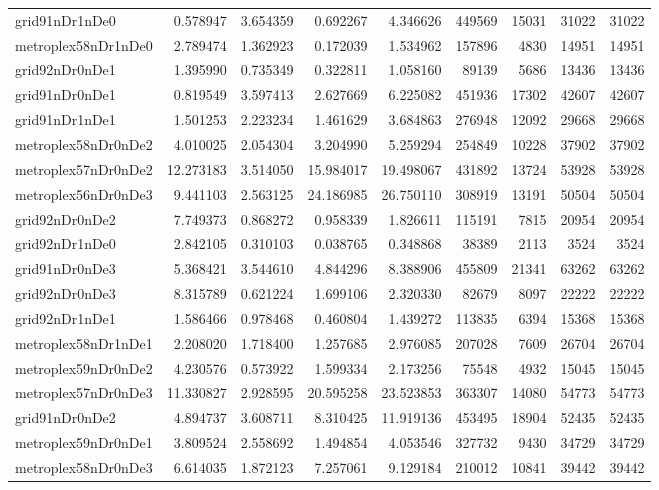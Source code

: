 \documentclass[../../../thesis.tex]{subfiles}
\begin{document}
\begin{longtable}{|l|r|r|r|r|r|r|r|r|}
grid91nDr1nDe0 & 0.578947 & 3.654359 & 0.692267 & 4.346626 & 449569 & 15031 & 31022 & 31022 \\
metroplex58nDr1nDe0 & 2.789474 & 1.362923 & 0.172039 & 1.534962 & 157896 & 4830 & 14951 & 14951 \\
grid92nDr0nDe1 & 1.395990 & 0.735349 & 0.322811 & 1.058160 & 89139 & 5686 & 13436 & 13436 \\
grid91nDr0nDe1 & 0.819549 & 3.597413 & 2.627669 & 6.225082 & 451936 & 17302 & 42607 & 42607 \\
grid91nDr1nDe1 & 1.501253 & 2.223234 & 1.461629 & 3.684863 & 276948 & 12092 & 29668 & 29668 \\
metroplex58nDr0nDe2 & 4.010025 & 2.054304 & 3.204990 & 5.259294 & 254849 & 10228 & 37902 & 37902 \\
metroplex57nDr0nDe2 & 12.273183 & 3.514050 & 15.984017 & 19.498067 & 431892 & 13724 & 53928 & 53928 \\
metroplex56nDr0nDe3 & 9.441103 & 2.563125 & 24.186985 & 26.750110 & 308919 & 13191 & 50504 & 50504 \\
grid92nDr0nDe2 & 7.749373 & 0.868272 & 0.958339 & 1.826611 & 115191 & 7815 & 20954 & 20954 \\
grid92nDr1nDe0 & 2.842105 & 0.310103 & 0.038765 & 0.348868 & 38389 & 2113 & 3524 & 3524 \\
grid91nDr0nDe3 & 5.368421 & 3.544610 & 4.844296 & 8.388906 & 455809 & 21341 & 63262 & 63262 \\
grid92nDr0nDe3 & 8.315789 & 0.621224 & 1.699106 & 2.320330 & 82679 & 8097 & 22222 & 22222 \\
grid92nDr1nDe1 & 1.586466 & 0.978468 & 0.460804 & 1.439272 & 113835 & 6394 & 15368 & 15368 \\
metroplex58nDr1nDe1 & 2.208020 & 1.718400 & 1.257685 & 2.976085 & 207028 & 7609 & 26704 & 26704 \\
metroplex59nDr0nDe2 & 4.230576 & 0.573922 & 1.599334 & 2.173256 & 75548 & 4932 & 15045 & 15045 \\
metroplex57nDr0nDe3 & 11.330827 & 2.928595 & 20.595258 & 23.523853 & 363307 & 14080 & 54773 & 54773 \\
grid91nDr0nDe2 & 4.894737 & 3.608711 & 8.310425 & 11.919136 & 453495 & 18904 & 52435 & 52435 \\
metroplex59nDr0nDe1 & 3.809524 & 2.558692 & 1.494854 & 4.053546 & 327732 & 9430 & 34729 & 34729 \\
metroplex58nDr0nDe3 & 6.614035 & 1.872123 & 7.257061 & 9.129184 & 210012 & 10841 & 39442 & 39442 \\

\end{longtable}
\end{document}
